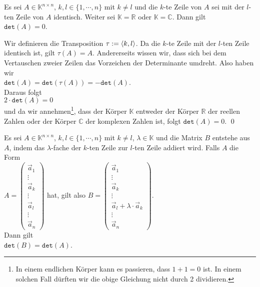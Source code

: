 \begin{Lemma}
  Es sei $A \in \mathbb{K}^{n \times n}$,  $k,l \in \{1,\cdots,n\}$ mit $k\not=l$ und die $k$-te
  Zeile von $A$ sei mit der $l$-ten Zeile von $A$ identisch.  
  Weiter sei $\mathbb{K} = \mathbb{R}$ oder $\mathbb{K} = \mathbb{C}$.
  Dann gilt
  \\[0.2cm]
  \hspace*{1.3cm}
  $\mathtt{det}(A) = 0$.
\end{Lemma}

\proof
Wir definieren die Transposition $\tau := \pair(k,l)$.  Da die $k$-te Zeile mit der $l$-ten Zeile
identisch ist, gilt  $\tau(A) = A$.  Andererseits wissen wir, dass sich bei dem Vertauschen zweier
Zeilen das Vorzeichen der Determinante umdreht.  Also haben wir
\\[0.2cm]
\hspace*{1.3cm}
$\mathtt{det}(A) = \mathtt{det}(\tau(A)) = -\mathtt{det}(A)$.
\\[0.2cm]
Daraus folgt 
\\[0.2cm]
\hspace*{1.3cm}
$2 \cdot \mathtt{det}(A) = 0$
\\[0.2cm]
und da wir annehmen\footnote{
  In einem endlichen K\"orper kann es passieren, dass $1 + 1 = 0$
  ist.  In einem solchen Fall d\"urften wir die obige Gleichung nicht durch 2 dividieren.
}, dass der K\"orper $\mathbb{K}$ entweder der K\"orper $\mathbb{R}$ der reellen
Zahlen oder der K\"orper $\mathbb{C}$ der komplexen Zahlen ist, folgt $\mathtt{det}(A) = 0$.
\qed


\begin{Lemma} \label{lemma:det-add-line}
  Es sei $A \in \mathbb{K}^{n \times n}$, $k,l \in \{1,\cdots,n\}$ mit $k\not=l$, $\lambda \in \mathbb{K}$ und die Matrix $B$
  entstehe aus $A$, indem das $\lambda$-fache der $k$-ten Zeile zur $l$-ten Zeile addiert wird.
  Falls $A$ die Form
  \\[0.2cm]
  \hspace*{1.3cm}
  $A = \left(
  \begin{array}{c}
    \vec{a}_1 \\ \vdots \\ \vec{a}_k \\ \vdots \\ \vec{a}_l \\ \vdots \\ \vec{a}_n
  \end{array} \right)
  $ \quad
  hat, gilt also \quad
  $B = 
  \left(\begin{array}{c}
    \vec{a}_1 \\ \vdots \\ \vec{a}_k \\ \vdots \\ \vec{a}_l + \lambda \cdot \vec{a}_k \\ \vdots \\ \vec{a}_n
  \end{array} 
  \right)
$.
  \\[0.2cm]
  Dann gilt 
  \\[0.2cm]
  \hspace*{1.3cm}
  $\mathtt{det}(B) = \mathtt{det}(A)$.
\end{Lemma}

